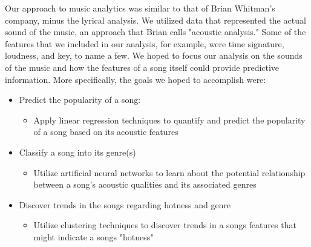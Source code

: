\documentclass[12pt]{article}
\begin{document}
Our approach to music analytics was similar to that of Brian Whitman's company, minus the lyrical analysis. We utilized data that represented the actual sound of the music, an approach that Brian calls "acoustic analysis." Some of the features that we included in our analysis, for example, were time signature, loudness, and key, to name a few. We hoped to focus our analysis on the sounds of the music and how the features of a song itself could provide predictive information. More specifically, the goals we hoped to accomplish were:
\vspace{-3.5mm}
\begin{itemize}
    \item Predict the popularity of a song:
    \vspace{-3.5mm}
    \begin{itemize}
        \item Apply linear regression techniques to quantify and predict the popularity of a song based on its acoustic features
        \vspace{-3.5mm}
    \end{itemize}
    \item Classify a song into its genre(s)
    \vspace{-3.5mm}
    \begin{itemize}
        \item Utilize artificial neural networks to learn about the potential relationship between a song's acoustic qualities and its associated genres 
        \vspace{-3.5mm}
    \end{itemize}
    \item Discover trends in the songs regarding hotness and genre
    \vspace{-3.5mm}
    \begin{itemize}
        \item Utilize clustering techniques to discover trends in a songs features that might indicate a songs "hotness"
    \end{itemize}
\end{itemize}
\end{document}
